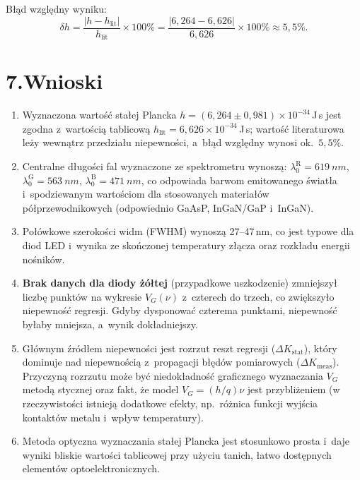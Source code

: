 \documentclass[a4paper,12pt]{article}
\begin{document}
Błąd względny wyniku:
\begin{equation*}
  \delta h = \frac{|h - h_\text{lit}|}{h_\text{lit}} \times 100\%
           = \frac{|6{,}264 - 6{,}626|}{6{,}626} \times 100\% \approx 5{,}5\%.
\end{equation*}

\section*{7.\quad Wnioski}

\begin{enumerate}
  \item Wyznaczona wartość stałej Plancka
        $h = (6{,}264 \pm 0{,}981) \times 10^{-34}$\,J\,s jest zgodna z~wartością
        tablicową $h_\text{lit} = 6{,}626 \times 10^{-34}$\,J\,s; wartość literaturowa
        leży wewnątrz przedziału niepewności, a~błąd względny wynosi ok.\ $5{,}5\%$.

  \item Centralne długości fal wyznaczone ze spektrometru wynoszą:
        $\lambda_0^\text{R} = \SI{619}{nm}$,
        $\lambda_0^\text{G} = \SI{563}{nm}$,
        $\lambda_0^\text{B} = \SI{471}{nm}$,
        co odpowiada barwom emitowanego światła i~spodziewanym wartościom dla
        stosowanych materiałów półprzewodnikowych (odpowiednio GaAsP, InGaN/GaP
        i~InGaN).

  \item Połówkowe szerokości widm (FWHM) wynoszą 27--47\,nm, co jest typowe dla
        diod LED i~wynika ze skończonej temperatury złącza oraz rozkładu energii
        nośników.

  \item \textbf{Brak danych dla diody żółtej} (przypadkowe uszkodzenie) zmniejszył
        liczbę punktów na wykresie $V_G(\nu)$ z~czterech do trzech, co zwiększyło
        niepewność regresji. Gdyby dysponować czterema punktami, niepewność byłaby
        mniejsza, a~wynik dokładniejszy.

  \item Głównym źródłem niepewności jest rozrzut reszt regresji ($\Delta K_\text{stat}$),
        który dominuje nad niepewnością z~propagacji błędów pomiarowych
        ($\Delta K_\text{meas}$). Przyczyną rozrzutu może być niedokładność graficznego
        wyznaczania $V_G$ metodą stycznej oraz fakt, że model $V_G = (h/q)\nu$
        jest przybliżeniem (w rzeczywistości istnieją dodatkowe efekty, np.\ różnica
        funkcji wyjścia kontaktów metalu i~wpływ temperatury).

  \item Metoda optyczna wyznaczania stałej Plancka jest stosunkowo prosta i~daje
        wyniki bliskie wartości tablicowej przy użyciu tanich, łatwo dostępnych
        elementów optoelektronicznych.
\end{enumerate}
\end{document}
